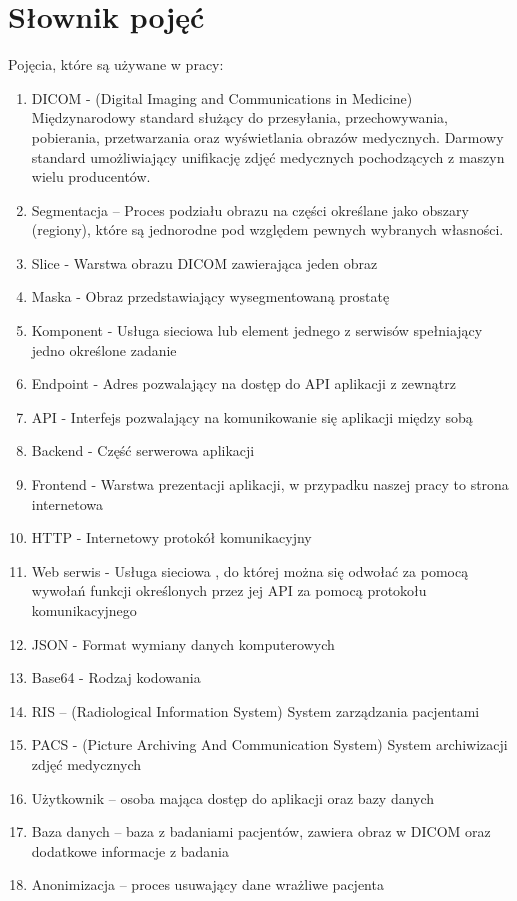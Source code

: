 \documentclass[a4paper,11pt,twoside]{report}
\theoremstyle{definition}
\begin{document}
\section{Słownik pojęć}
Pojęcia, które są używane w pracy:
\begin {enumerate}
\item DICOM - (Digital Imaging and Communications in Medicine) Międzynarodowy standard służący do przesyłania, przechowywania, pobierania, przetwarzania oraz wyświetlania obrazów medycznych. Darmowy standard umożliwiający unifikację zdjęć medycznych pochodzących z maszyn wielu producentów.
\item Segmentacja – Proces podziału obrazu na części określane jako obszary (regiony), które są jednorodne pod względem pewnych wybranych własności.
\item Slice - Warstwa obrazu DICOM zawierająca jeden obraz
\item Maska - Obraz przedstawiający wysegmentowaną prostatę
\item Komponent - Usługa sieciowa lub element jednego z serwisów spełniający jedno określone zadanie
\item Endpoint - Adres pozwalający na dostęp do API aplikacji z zewnątrz
\item API - Interfejs pozwalający na komunikowanie się aplikacji między sobą 
\item Backend - Część serwerowa aplikacji 
\item Frontend - Warstwa prezentacji aplikacji, w przypadku naszej pracy to strona internetowa
\item HTTP - Internetowy protokół komunikacyjny
\item Web serwis - Usługa sieciowa , do której można się odwołać za pomocą wywołań funkcji określonych przez jej API za pomocą protokołu komunikacyjnego
\item JSON - Format wymiany danych komputerowych
\item Base64 - Rodzaj kodowania 
\item RIS – (Radiological Information System) System zarządzania pacjentami 
\item PACS - (Picture Archiving And Communication System) System archiwizacji zdjęć medycznych
\item Użytkownik – osoba mająca dostęp do aplikacji oraz bazy danych
\item Baza danych – baza z badaniami pacjentów, zawiera obraz w DICOM oraz dodatkowe informacje z badania
\item Anonimizacja – proces usuwający dane wrażliwe pacjenta
\end {enumerate}
\end{document}
